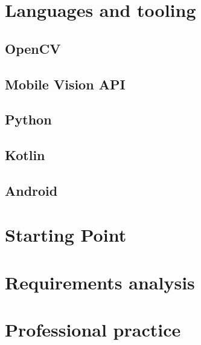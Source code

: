 \section{Languages and tooling}
\subsection{OpenCV}
\subsection{Mobile Vision API}
\subsection{Python}
\subsection{Kotlin}
\subsection{Android}

\section{Starting Point}
\section{Requirements analysis}
\section{Professional practice}